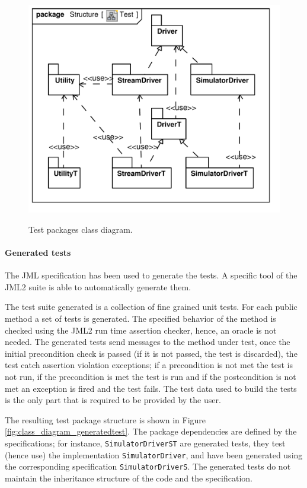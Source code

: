 \documentclass{article} \usepackage{times}
\newcommand{\lil}[1]{\texttt{\lstinline|#1|}}
\begin{document}
\begin{figure}[htb!]
  \centering
  \includegraphics[scale=0.4]{UML_model/Class_Diagram__Structure__Test}
  \label{fig:class_diagram_test}
  \caption{Test packages class diagram.}
\end{figure}

\paragraph*{Generated tests}

The JML specification has been used to generate the tests.  A specific
tool of the JML2 suite is able to automatically generate
them\cite{Cheon-Leavens02}.

The test suite generated is a collection of fine grained unit tests.
For each public method a set of tests is generated.  The specified
behavior of the method is checked using the JML2 run time assertion
checker, hence, an oracle is not needed.  The generated tests send
messages to the method under test, once the initial precondition check is passed (if it is not passed, the test is discarded), the test catch assertion violation
exceptions;
if a precondition is not met the test is not run, if the
precondition is met the test is run and if the postcondition is not
met an exception is fired and the test fails.  The test data
used to build the tests is the only part that is required to be
provided by the user.

The resulting test package structure is shown in Figure
\ref{fig:class_diagram_generatedtest}.  The package dependencies are
defined by the specifications; for instance, \lil{SimulatorDriverST}
are generated tests, they test (hence use) the implementation
\lil{SimulatorDriver}, and have been generated using the
corresponding specification \lil{SimulatorDriverS}.  The
generated tests do not maintain the inheritance structure of the code
and the specification.
\end{document}
